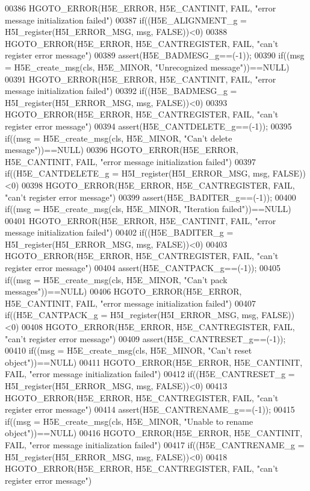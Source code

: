 \begin{DoxyCode}
00386     HGOTO\_ERROR(H5E\_ERROR, H5E\_CANTINIT, FAIL, "error message initialization failed")
00387 if((H5E\_ALIGNMENT\_g = H5I\_register(H5I\_ERROR\_MSG, msg, FALSE))<0)
00388     HGOTO\_ERROR(H5E\_ERROR, H5E\_CANTREGISTER, FAIL, "can't register error message")
00389 assert(H5E\_BADMESG\_g==(-1));
00390 if((msg = H5E\_create\_msg(cls, H5E\_MINOR, "Unrecognized message"))==NULL)
00391     HGOTO\_ERROR(H5E\_ERROR, H5E\_CANTINIT, FAIL, "error message initialization failed")
00392 if((H5E\_BADMESG\_g = H5I\_register(H5I\_ERROR\_MSG, msg, FALSE))<0)
00393     HGOTO\_ERROR(H5E\_ERROR, H5E\_CANTREGISTER, FAIL, "can't register error message")
00394 assert(H5E\_CANTDELETE\_g==(-1));
00395 if((msg = H5E\_create\_msg(cls, H5E\_MINOR, "Can't delete message"))==NULL)
00396     HGOTO\_ERROR(H5E\_ERROR, H5E\_CANTINIT, FAIL, "error message initialization failed")
00397 if((H5E\_CANTDELETE\_g = H5I\_register(H5I\_ERROR\_MSG, msg, FALSE))<0)
00398     HGOTO\_ERROR(H5E\_ERROR, H5E\_CANTREGISTER, FAIL, "can't register error message")
00399 assert(H5E\_BADITER\_g==(-1));
00400 if((msg = H5E\_create\_msg(cls, H5E\_MINOR, "Iteration failed"))==NULL)
00401     HGOTO\_ERROR(H5E\_ERROR, H5E\_CANTINIT, FAIL, "error message initialization failed")
00402 if((H5E\_BADITER\_g = H5I\_register(H5I\_ERROR\_MSG, msg, FALSE))<0)
00403     HGOTO\_ERROR(H5E\_ERROR, H5E\_CANTREGISTER, FAIL, "can't register error message")
00404 assert(H5E\_CANTPACK\_g==(-1));
00405 if((msg = H5E\_create\_msg(cls, H5E\_MINOR, "Can't pack messages"))==NULL)
00406     HGOTO\_ERROR(H5E\_ERROR, H5E\_CANTINIT, FAIL, "error message initialization failed")
00407 if((H5E\_CANTPACK\_g = H5I\_register(H5I\_ERROR\_MSG, msg, FALSE))<0)
00408     HGOTO\_ERROR(H5E\_ERROR, H5E\_CANTREGISTER, FAIL, "can't register error message")
00409 assert(H5E\_CANTRESET\_g==(-1));
00410 if((msg = H5E\_create\_msg(cls, H5E\_MINOR, "Can't reset \textcolor{keywordtype}{object}"))==NULL)
00411     HGOTO\_ERROR(H5E\_ERROR, H5E\_CANTINIT, FAIL, "error message initialization failed")
00412 if((H5E\_CANTRESET\_g = H5I\_register(H5I\_ERROR\_MSG, msg, FALSE))<0)
00413     HGOTO\_ERROR(H5E\_ERROR, H5E\_CANTREGISTER, FAIL, "can't register error message")
00414 assert(H5E\_CANTRENAME\_g==(-1));
00415 if((msg = H5E\_create\_msg(cls, H5E\_MINOR, "Unable to rename \textcolor{keywordtype}{object}"))==NULL)
00416     HGOTO\_ERROR(H5E\_ERROR, H5E\_CANTINIT, FAIL, "error message initialization failed")
00417 if((H5E\_CANTRENAME\_g = H5I\_register(H5I\_ERROR\_MSG, msg, FALSE))<0)
00418     HGOTO\_ERROR(H5E\_ERROR, H5E\_CANTREGISTER, FAIL, "can't register error message")

\end{DoxyCode}
